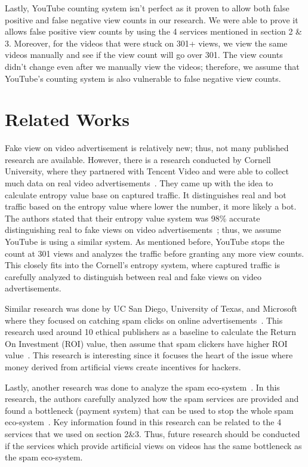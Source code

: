 \documentclass[conference]{IEEEtran}
\begin{document}
Lastly, YouTube counting system isn't perfect as it proven to allow both false positive and false negative view counts in our research. We were able to prove it allows false positive view counts by using the 4 services mentioned in section 2 \& 3. Moreover, for the videos that were stuck on 301+ views, we view the same videos manually and see if the view count will go over 301. The view counts didn't change even after we manually view the videos; therefore, we assume that YouTube’s counting
system is also vulnerable to false negative view counts.

\section{Related Works}

Fake view on video advertisement is relatively new; thus, not many published research are available. However, there is a research conducted by Cornell University, where they partnered with Tencent Video and were able to collect much data on real video advertisements~\cite{c5}. They came up with the idea to calculate entropy value base on captured traffic. It distinguishes real and bot traffic based on the entropy value where lower the number, it more likely a bot. The authors stated that
their entropy value system was 98\% accurate distinguishing real to fake views on video advertisements~\cite{c5}; thus, we assume YouTube is using a similar system. As mentioned before, YouTube stops the count at 301 views and analyzes the traffic before granting any more view counts. This closely fits into the Cornell’s entropy system, where captured traffic is carefully analyzed to distinguish between real and fake views on video advertisements.

Similar research was done by UC San Diego, University of Texas, and Microsoft where they focused on catching spam clicks on online advertisements~\cite{c18}. This research used around 10 ethical publishers as a baseline to calculate the Return On Investment (ROI) value, then assume that spam clickers have higher ROI value~\cite{c18}. This research is interesting since it focuses the heart of the issue where money derived from artificial views create incentives for hackers.

Lastly, another research was done to analyze the spam eco-system~\cite{c18}. In this research, the authors carefully analyzed how the spam services are provided and found a bottleneck (payment system) that can be used to stop the whole spam eco-system~\cite{c18}. Key information found in this research can be related to the 4 services that we used on section 2\&3. Thus, future research should be conducted if the services which provide artificial views on videos has the same bottleneck as the
spam eco-system.
\end{document}
